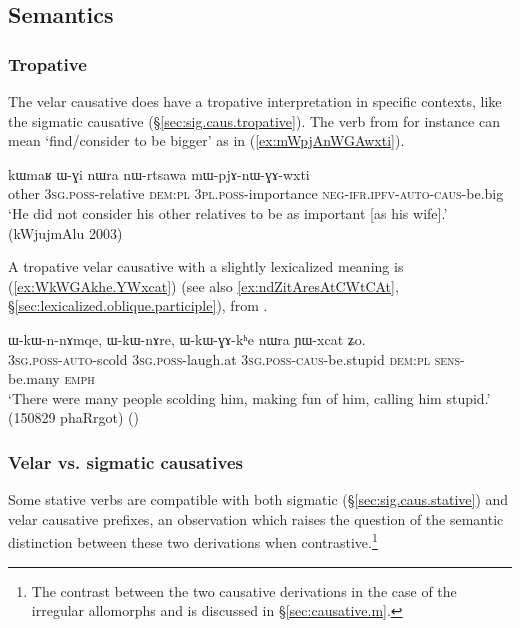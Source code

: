 \subsection{Semantics} \label{sec:velar.causative.semantics}
 
\subsubsection{Tropative} \label{sec:velar.causative.tropative}
 The velar causative does have a tropative interpretation in specific contexts, like the sigmatic causative (§\ref{sec:sig.caus.tropative}). The verb  from   for instance can mean `find/consider to be bigger' as in (\ref{ex:mWpjAnWGAwxti}).

 \begin{exe}
\ex \label{ex:mWpjAnWGAwxti}
\gll kɯmaʁ ɯ-ɣi nɯra nɯ-rtsawa mɯ-pjɤ-nɯ-ɣɤ-wxti \\
other \textsc{3sg}.\textsc{poss}-relative \textsc{dem}:\textsc{pl} \textsc{3pl}.\textsc{poss}-importance \textsc{neg}-\textsc{ifr}.\textsc{ipfv}-\textsc{auto}-\textsc{caus}-be.big \\
\glt `He did not consider his other relatives to be as important [as his wife].' (kWjujmAlu 2003)
\end{exe} 

A tropative velar causative with a slightly lexicalized meaning is   (\ref{ex:WkWGAkhe.YWxcat}) (see also \ref{ex:ndZitAresAtCWtCAt}, §\ref{sec:lexicalized.oblique.participle}), from .
 
 \begin{exe}
\ex \label{ex:WkWGAkhe.YWxcat}
\gll  ɯ-kɯ-n-nɤmqe, ɯ-kɯ-nɤre, ɯ-kɯ-ɣɤ-kʰe nɯra ɲɯ-xcat ʑo. \\
\textsc{3sg}.\textsc{poss}-\textsc{auto}-scold \textsc{3sg}.\textsc{poss}-laugh.at \textsc{3sg}.\textsc{poss}-\textsc{caus}-be.stupid \textsc{dem}:\textsc{pl} \textsc{sens}-be.many \textsc{emph} \\
\glt `There were many people scolding him, making fun of him, calling him stupid.' (150829 phaRrgot)
()
 \end{exe} 
 
\subsubsection{Velar vs. sigmatic causatives} \label{sec:velar.causative.vs.sigmatic.causative}
Some stative verbs are compatible with both sigmatic (§\ref{sec:sig.caus.stative}) and velar causative prefixes, an observation which raises the question of the semantic distinction between these two derivations when contrastive.\footnote{The contrast between the two causative derivations in the case of the irregular allomorphs  and  is discussed in §\ref{sec:causative.m}. }


